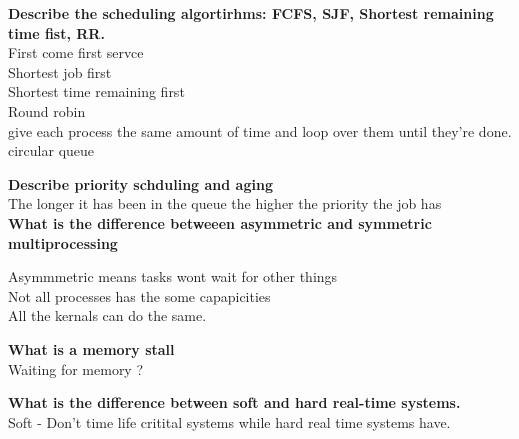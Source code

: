 \documentclass[a4paper,10pt,titlepage]{report}
\begin{document}
\textbf{Describe the scheduling algortirhms: FCFS, SJF, Shortest remaining time fist, RR.\\}
\hspace{10mm} First come first servce\\
\hspace{10mm} Shortest job first \\
\hspace{10mm} Shortest time remaining first \\
\hspace{10mm} Round robin\\
\hspace{10mm}give each process the same amount of time and loop over them until they're done. circular queue\\\vspace{5mm}




\textbf{Describe priority schduling and aging\\}
\hspace{10mm} The longer it has been in the queue the higher the priority the job has\\


\textbf{What is the difference betweeen asymmetric and symmetric multiprocessing\\} \vspace{5mm}

\hspace{10mm} Asymmmetric means tasks wont wait for other things \\
\hspace{10mm} Not all processes has the some capapicities\\
\hspace{10mm} All the kernals can do the same.\\ \vspace{5mm}



\textbf{What is a memory stall\\}
\hspace{10mm} Waiting for memory ? \\\vspace{5mm}


\textbf{What is the difference between soft and hard real-time systems.\\}
\hspace{10mm} Soft -  Don't time life critital systems while hard real time systems have.\\
\vspace{5mm}
\end{document}
